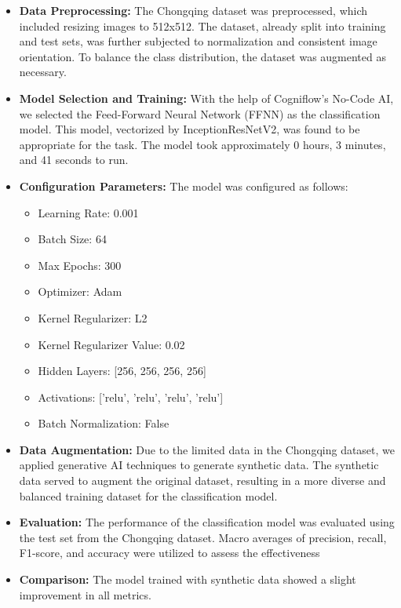 \begin{itemize}
    \item \textbf{Data Preprocessing:} The Chongqing dataset was preprocessed, which included resizing images to 512x512. The dataset, already split into training and test sets, was further subjected to normalization and consistent image orientation. To balance the class distribution, the dataset was augmented as necessary.

    \item \textbf{Model Selection and Training:} With the help of Cogniflow's No-Code AI, we selected the Feed-Forward Neural Network (FFNN) as the classification model. This model, vectorized by InceptionResNetV2, was found to be appropriate for the task. The model took approximately 0 hours, 3 minutes, and 41 seconds to run.

    \item \textbf{Configuration Parameters:} The model was configured as follows:
    \begin{itemize}
        \item Learning Rate: 0.001
        \item Batch Size: 64
        \item Max Epochs: 300
        \item Optimizer: Adam
        \item Kernel Regularizer: L2
        \item Kernel Regularizer Value: 0.02
        \item Hidden Layers: [256, 256, 256, 256]
        \item Activations: ['relu', 'relu', 'relu', 'relu']
        \item Batch Normalization: False
    \end{itemize}

    \item \textbf{Data Augmentation:} Due to the limited data in the Chongqing dataset, we applied generative AI techniques to generate synthetic data. The synthetic data served to augment the original dataset, resulting in a more diverse and balanced training dataset for the classification model.

    \item \textbf{Evaluation:} The performance of the classification model was evaluated using the test set from the Chongqing dataset. Macro averages of precision, recall, F1-score, and accuracy were utilized to assess the effectiveness

    \item \textbf{Comparison:} The model trained with synthetic data showed a slight improvement in all metrics.
\end{itemize}

